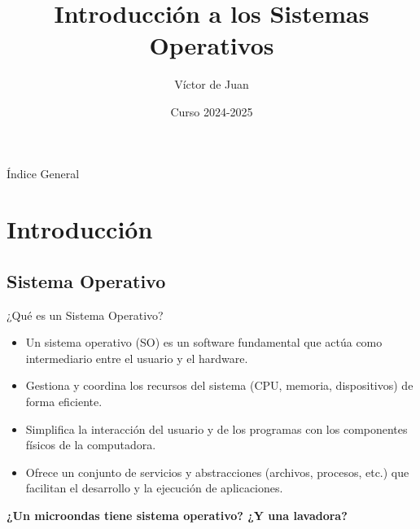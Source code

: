 \documentclass{beamer}
\title{Introducción a los Sistemas Operativos}
\author{Víctor de Juan}
\date{Curso 2024-2025}
\begin{document}
\begin{frame}
    \titlepage
\end{frame}


\begin{frame}{Índice General}
    \tableofcontents
\end{frame}


\section{Introducción}
\subsection{Sistema Operativo}
\begin{frame}{¿Qué es un Sistema Operativo?}
    \begin{itemize}
        \item Un sistema operativo (SO) es un software fundamental que actúa como intermediario entre el usuario y el hardware.
        \item Gestiona y coordina los recursos del sistema (CPU, memoria, dispositivos) de forma eficiente.
        \item Simplifica la interacción del usuario y de los programas con los componentes físicos de la computadora.
        \item Ofrece un conjunto de servicios y abstracciones (archivos, procesos, etc.) que facilitan el desarrollo y la ejecución de aplicaciones.
    \end{itemize}
    \vfill
    \centering
    \textbf{¿Un microondas tiene sistema operativo? ¿Y una lavadora?}
\end{frame}

\end{document}
